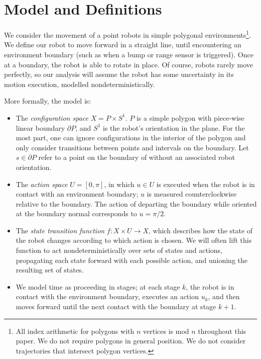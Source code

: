 \documentclass[]{styles/svproc}  %
\begin{document}
\section{Model and Definitions}

We consider the movement of a point robots in simple 
polygonal environments\footnote{All index arithmetic for polygons with $n$ vertices is mod $n$ 
throughout this paper. We do not require polygons in general position. We do
not consider trajectories that intersect polygon vertices.}. We define our robot to move forward in a straight line, until
encountering an environment boundary (such as when a bump or range sensor is
triggered). Once at a boundary, the robot is able to rotate in place.
Of course, robots rarely move perfectly, so our analysis will assume the
robot has some uncertainty in its motion execution, modelled
nondeterministically.

More formally, the model is:
\begin{itemize}
\item The \emph{configuration space} $X = P \times S^1$. $P$ is a simple polygon with 
piece-wise linear boundary $\partial P$, and $S^1$ is the robot's orientation in the plane. For the most part, one can ignore configurations in the interior
of the polygon and only consider transitions between points and intervals on the
boundary. Let $s \in \partial P$ refer to a point on
the boundary of without an associated robot orientation.
\item The \emph{action space} $U = [0,\pi]$, in which $u \in U$ is executed when
the robot is in contact with an environment boundary; $u$ is measured counterclockwise
relative to the boundary. The action of departing the boundary while oriented at the boundary
normal corresponds to $u = \pi/2$.
\item The \emph{state transition function} $f: X \times U \to X$, which
describes how the state of the robot changes according to which action is
chosen. We will often lift this function to act nondeterministically over sets
of states and actions, propagating each state forward with each possible action,
and unioning the resulting set of states. 
\item We model time as proceeding in stages; at each stage $k$, the robot
is in contact with the environment boundary, executes an action $u_k$, and then
moves forward until the next contact with the boundary at stage $k+1$.
\end{itemize}
\end{document}
